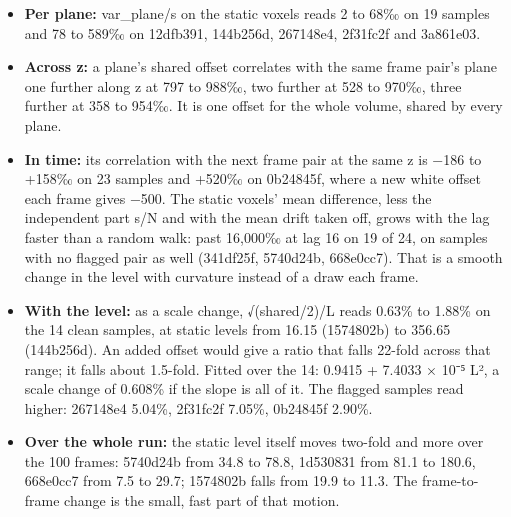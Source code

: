 \begin{enumerate}
\begin{itemize}
\item \textbf{Per plane:} var\_\allowbreak{}plane/s on the static voxels reads 2 to 68‰ on 19 samples and 78 to 589‰ on 12dfb391, 144b256d, 267148e4, 2f31fc2f and 3a861e03.
\item \textbf{Across z:} a plane's shared offset correlates with the same frame pair's plane one further along z at 797 to 988‰, two further at 528 to 970‰, three further at 358 to 954‰. It is one offset for the whole volume, shared by every plane.
\item \textbf{In time:} its correlation with the next frame pair at the same z is −186 to +158‰ on 23 samples and +520‰ on 0b24845f, where a new white offset each frame gives −500. The static voxels' mean difference, less the independent part s/N and with the mean drift taken off, grows with the lag faster than a random walk: past 16,000‰ at lag 16 on 19 of 24, on samples with no flagged pair as well (341df25f, 5740d24b, 668e0cc7). That is a smooth change in the level with curvature instead of a draw each frame.
\item \textbf{With the level:} as a scale change, √(shared/2)/L reads 0.63\% to 1.88\% on the 14 clean samples, at static levels from 16.15 (1574802b) to 356.65 (144b256d). An added offset would give a ratio that falls 22-fold across that range; it falls about 1.5-fold. Fitted over the 14: 0.9415 + 7.4033 × 10⁻⁵ L², a scale change of 0.608\% if the slope is all of it. The flagged samples read higher: 267148e4 5.04\%, 2f31fc2f 7.05\%, 0b24845f 2.90\%.
\item \textbf{Over the whole run:} the static level itself moves two-fold and more over the 100 frames: 5740d24b from 34.8 to 78.8, 1d530831 from 81.1 to 180.6, 668e0cc7 from 7.5 to 29.7; 1574802b falls from 19.9 to 11.3. The frame-to-frame change is the small, fast part of that motion.
\end{itemize}


\end{enumerate}
